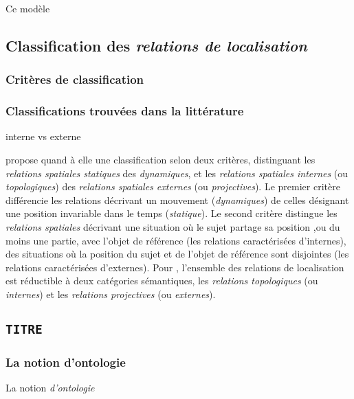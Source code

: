 Ce modèle 


\subsection{Classification des \emph{relations de localisation}}

\subsubsection{Critères de classification}

\subsubsection{Classifications trouvées dans la littérature}

interne vs externe

\textcite{Borillo1998} propose quand à elle une classification selon
deux critères, distinguant les \emph{relations spatiales statiques}
des \emph{dynamiques}, et les \emph{relations spatiales internes} (ou
\emph{topologiques}) des \emph{relations spatiales externes} (ou
\emph{projectives}). Le premier critère différencie les relations
décrivant un mouvement (\emph{dynamiques}) de celles désignant une
position invariable dans le temps (\emph{statique}). Le second critère
distingue les \emph{relations spatiales} décrivant une situation où le
sujet partage sa position ,ou du moins une partie, avec l'objet de
référence (\ie les relations caractérisées d'internes), des situations
où la position du sujet et de l'objet de référence sont disjointes
(\ie les relations caractérisées d'externes). Pour
\textcite{Borillo1998}, l'ensemble des relations de localisation est
réductible à deux catégories sémantiques, les \emph{relations
  topologiques} (ou \emph{internes}) et les \emph{relations
  projectives} (ou \emph{externes}).

\subsection{\texttt{TITRE}}

\subsubsection{La notion d'ontologie}

La notion \emph{d'ontologie}


